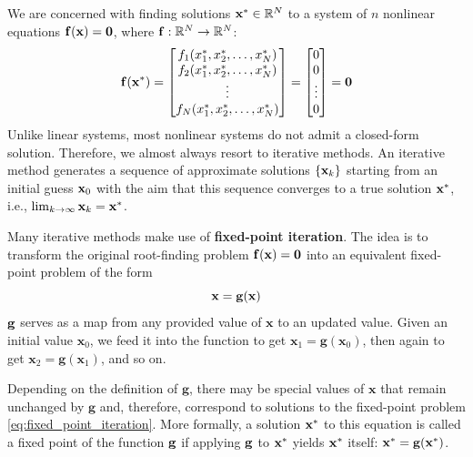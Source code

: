 We are concerned with finding solutions $\mathbf{x}^* \in \mathbb{R}^N$ to a system of $n$ nonlinear equations $\mathbf{f}(\mathbf{x}) = \mathbf{0}$, where $\mathbf{f}: \mathbb{R}^N \to \mathbb{R}^N$:
\begin{equation}
    \mathbf{f}(\mathbf{x}^*) = \begin{bmatrix} f_1(x_1^*, x_2^*, \dots, x_N^*) \\ f_2(x_1^*, x_2^*, \dots, x_N^*) \\ \vdots \\ f_N(x_1^*, x_2^*, \dots, x_N^*) \end{bmatrix} = \begin{bmatrix} 0 \\ 0 \\ \vdots \\ 0 \end{bmatrix} = \mathbf{0}
\end{equation}
Unlike linear systems, most nonlinear systems do not admit a closed-form solution. Therefore, we almost always resort to iterative methods. An iterative method generates a sequence of approximate solutions $\{\mathbf{x}_k\}$ starting from an initial guess $\mathbf{x}_0$ with the aim that this sequence converges to a true solution $\mathbf{x}^*$, i.e., $\lim_{k\to\infty} \mathbf{x}_k = \mathbf{x}^*$. 

Many iterative methods make use of  \textbf{fixed-point iteration}. The idea is to transform the original root-finding problem $\mathbf{f}(\mathbf{x}) = \mathbf{0}$ into an equivalent fixed-point problem of the form
\begin{equation}
    \mathbf{x} = \mathbf{g}(\mathbf{x})
    \label{eq:fixed_point_iteration}
\end{equation}
$\mathbf{g}$ serves as a map from any provided value of $\mathbf x$ to an updated value. Given an initial value $\mathbf x_0$, we feed it into the function to get $\mathbf x_1 = \mathbf g(\mathbf x_0)$, then again to get $\mathbf x_2 = \mathbf g(\mathbf x_1)$, and so on.

Depending on the definition of $\mathbf g$, there may be special values of $\mathbf x$ that remain unchanged by $\mathbf g$ and, therefore, correspond to solutions to the fixed-point problem \autoref{eq:fixed_point_iteration}. More formally, a solution $\mathbf{x}^*$ to this equation is called a fixed point of the function $\mathbf{g}$ if applying $\mathbf{g}$ to $\mathbf{x}^*$ yields $\mathbf{x}^*$ itself: $\mathbf{x}^* = \mathbf{g}(\mathbf{x}^*)$. 

